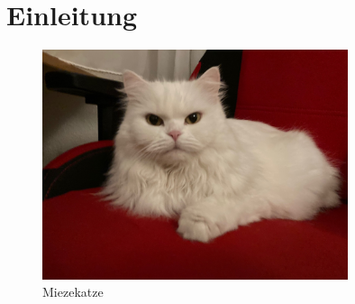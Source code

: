 \chapter{Einleitung}

\blindtext[10]

\begin{figure}
\begin{center}
\includegraphics[width=0.8\textwidth]{Bilder/Katze.jpg}
\end{center}
\caption{Miezekatze}\label{fig:mieze}
\end{figure}


\blindtext[10]
